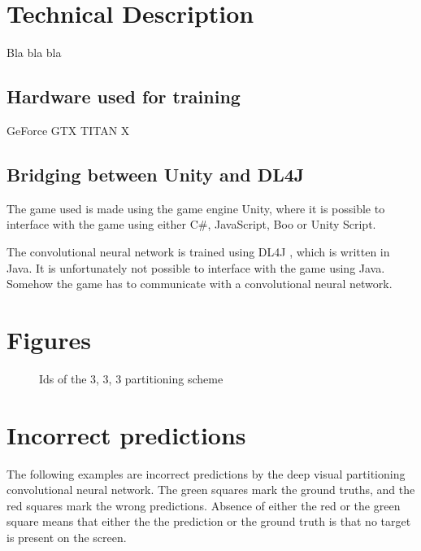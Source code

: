 
\section{Technical Description}
Bla bla bla

\subsection{Hardware used for training}
\label{sub:hardware}
GeForce GTX TITAN X

\subsection{Bridging between Unity and DL4J}
The game used is made using the game engine Unity, where it is possible to interface with the game using either C\#, JavaScript, Boo or Unity Script.

The convolutional neural network is trained using DL4J , which is written in Java.
It is unfortunately not possible to interface with the game using Java. Somehow the game has to communicate with a convolutional neural network.

\section{Figures}

\begin{figure}[H]
	\begin{scriptsize}
		\sffamily
		\def\svgwidth{\textwidth}
		
	\end{scriptsize}
	\caption{Ids of the 3, 3, 3 partitioning scheme}
	\label{fig:ids}
\end{figure}

\section{Incorrect predictions}
\label{sec:incorrectpredictions}
The following examples are incorrect predictions by the deep visual partitioning convolutional neural network. The green squares mark the ground truths, and the red squares mark the wrong predictions. Absence of either the red or the green square means that either the the prediction  or the ground truth is that no target is present on the screen.

\begin{figure}[H]
	\begin{center}
	\begin{scriptsize}
		\sffamily
		\def\svgwidth{0.95\textwidth}
		
	\end{scriptsize}
	\label{fig:failcollection1}
	\end{center}
\end{figure}


